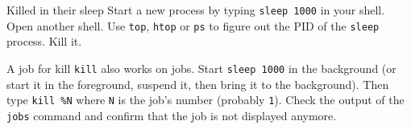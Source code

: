 \documentclass{TheAlternativeCourse}
\begin{document}
\begin{exercisebox}{Killed in their sleep}
	Start a new process by typing \texttt{sleep 1000} in your shell. Open another shell. Use \texttt{top}, \texttt{htop} or \texttt{ps} to figure out the PID of the \texttt{sleep} process. Kill it.
\end{exercisebox}

\begin{exercisebox}{A job for kill}
	\texttt{kill} also works on jobs. Start \texttt{sleep 1000} in the background (or start it in the foreground, suspend it, then bring it to the background). Then type \texttt{kill \%N} where \texttt{N} is the job's number (probably \texttt{1}). Check the output of the \texttt{jobs} command and confirm that the job is not displayed anymore.
\end{exercisebox}
\end{document}
